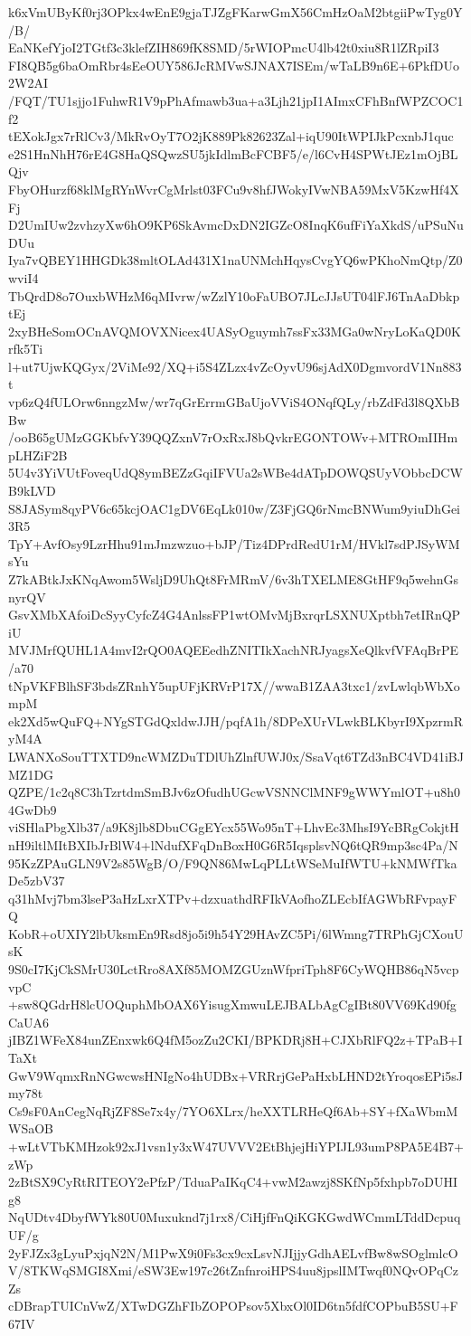 k6xVmUByKf0rj3OPkx4wEnE9gjaTJZgFKarwGmX56CmHzOaM2btgiiPwTyg0Y/B/
EaNKefYjoI2TGtf3c3klefZIH869fK8SMD/5rWIOPmcU4lb42t0xiu8R1lZRpiI3
FI8QB5g6baOmRbr4sEeOUY586JcRMVwSJNAX7ISEm/wTaLB9n6E+6PkfDUo2W2AI
/FQT/TU1sjjo1FuhwR1V9pPhAfmawb3ua+a3Ljh21jpI1AImxCFhBnfWPZCOC1f2
tEXokJgx7rRlCv3/MkRvOyT7O2jK889Pk82623Zal+iqU90ItWPIJkPcxnbJ1quc
e2S1HnNhH76rE4G8HaQSQwzSU5jkIdlmBcFCBF5/e/l6CvH4SPWtJEz1mOjBLQjv
FbyOHurzf68klMgRYnWvrCgMrlst03FCu9v8hfJWokyIVwNBA59MxV5KzwHf4XFj
D2UmIUw2zvhzyXw6hO9KP6SkAvmcDxDN2IGZcO8InqK6ufFiYaXkdS/uPSuNuDUu
Iya7vQBEY1HHGDk38mltOLAd431X1naUNMchHqysCvgYQ6wPKhoNmQtp/Z0wviI4
TbQrdD8o7OuxbWHzM6qMIvrw/wZzlY10oFaUBO7JLcJJsUT04lFJ6TnAaDbkptEj
2xyBHeSomOCnAVQMOVXNicex4UASyOguymh7ssFx33MGa0wNryLoKaQD0Krfk5Ti
l+ut7UjwKQGyx/2ViMe92/XQ+i5S4ZLzx4vZcOyvU96sjAdX0DgmvordV1Nn883t
vp6zQ4fULOrw6nngzMw/wr7qGrErrmGBaUjoVViS4ONqfQLy/rbZdFd3l8QXbBBw
/ooB65gUMzGGKbfvY39QQZxnV7rOxRxJ8bQvkrEGONTOWv+MTROmIIHmpLHZiF2B
5U4v3YiVUtFoveqUdQ8ymBEZzGqiIFVUa2sWBe4dATpDOWQSUyVObbcDCWB9kLVD
S8JASym8qyPV6c65kcjOAC1gDV6EqLk010w/Z3FjGQ6rNmcBNWum9yiuDhGei3R5
TpY+AvfOsy9LzrHhu91mJmzwzuo+bJP/Tiz4DPrdRedU1rM/HVkl7sdPJSyWMsYu
Z7kABtkJxKNqAwom5WsljD9UhQt8FrMRmV/6v3hTXELME8GtHF9q5wehnGsnyrQV
GsvXMbXAfoiDcSyyCyfcZ4G4AnlssFP1wtOMvMjBxrqrLSXNUXptbh7etIRnQPiU
MVJMrfQUHL1A4mvI2rQO0AQEEedhZNITIkXachNRJyagsXeQlkvfVFAqBrPE/a70
tNpVKFBlhSF3bdsZRnhY5upUFjKRVrP17X//wwaB1ZAA3txc1/zvLwlqbWbXompM
ek2Xd5wQuFQ+NYgSTGdQxldwJJH/pqfA1h/8DPeXUrVLwkBLKbyrI9XpzrmRyM4A
LWANXoSouTTXTD9ncWMZDuTDlUhZlnfUWJ0x/SsaVqt6TZd3nBC4VD41iBJMZ1DG
QZPE/1c2q8C3hTzrtdmSmBJv6zOfudhUGcwVSNNClMNF9gWWYmlOT+u8h04GwDb9
viSHlaPbgXlb37/a9K8jlb8DbuCGgEYcx55Wo95nT+LhvEc3MhsI9YcBRgCokjtH
nH9iltlMItBXIbJrBlW4+lNdufXFqDnBoxH0G6R5IqsplsvNQ6tQR9mp3sc4Pa/N
95KzZPAuGLN9V2s85WgB/O/F9QN86MwLqPLLtWSeMuIfWTU+kNMWfTkaDe5zbV37
q31hMvj7bm3lseP3aHzLxrXTPv+dzxuathdRFIkVAofhoZLEcbIfAGWbRFvpayFQ
KobR+oUXIY2lbUksmEn9Rsd8jo5i9h54Y29HAvZC5Pi/6lWmng7TRPhGjCXouUsK
9S0cI7KjCkSMrU30LctRro8AXf85MOMZGUznWfpriTph8F6CyWQHB86qN5vcpvpC
+sw8QGdrH8lcUOQuphMbOAX6YisugXmwuLEJBALbAgCgIBt80VV69Kd90fgCaUA6
jIBZ1WFeX84unZEnxwk6Q4fM5ozZu2CKI/BPKDRj8H+CJXbRlFQ2z+TPaB+ITaXt
GwV9WqmxRnNGwcwsHNIgNo4hUDBx+VRRrjGePaHxbLHND2tYroqosEPi5sJmy78t
Cs9sF0AnCegNqRjZF8Se7x4y/7YO6XLrx/heXXTLRHeQf6Ab+SY+fXaWbmMWSaOB
+wLtVTbKMHzok92xJ1vsn1y3xW47UVVV2EtBhjejHiYPIJL93umP8PA5E4B7+zWp
2zBtSX9CyRtRITEOY2ePfzP/TduaPaIKqC4+vwM2awzj8SKfNp5fxhpb7oDUHIg8
NqUDtv4DbyfWYk80U0Muxuknd7j1rx8/CiHjfFnQiKGKGwdWCmmLTddDcpuqUF/g
2yFJZx3gLyuPxjqN2N/M1PwX9i0Fs3cx9cxLsvNJIjjyGdhAELvfBw8wSOglmlcO
V/8TKWqSMGI8Xmi/eSW3Ew197c26tZnfnroiHPS4uu8jpslIMTwqf0NQvOPqCzZs
cDBrapTUICnVwZ/XTwDGZhFIbZOPOPsov5XbxOl0ID6tn5fdfCOPbuB5SU+F67IV
